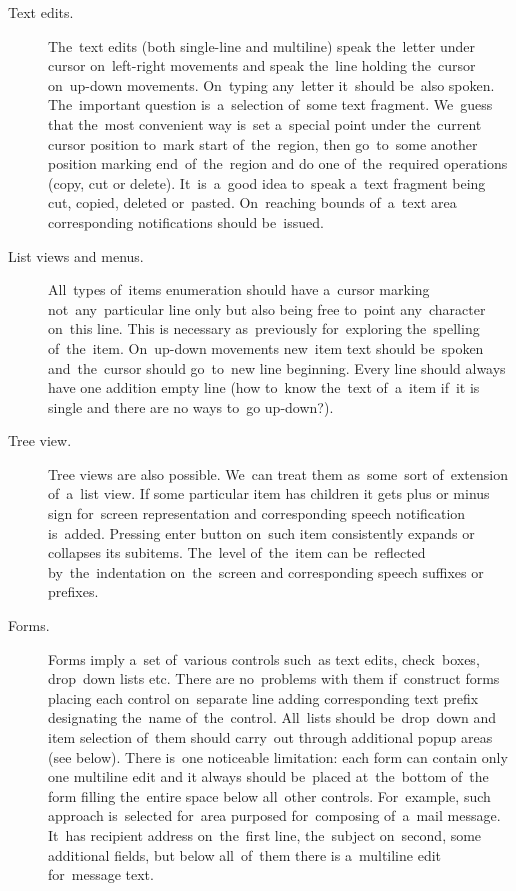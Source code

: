 \documentclass{acm_proc_article-sp}
\begin{document}
\begin{description}

\item[Text edits.]
The~text edits (both single-line and multiline) speak the~letter under cursor on~left-right movements 
and speak the~line holding the~cursor on~up-down movements.
On~typing any~letter it~should be~also spoken.
The~important question is~a~selection of~some text fragment.
We~guess that the~most convenient way is~set a~special point under the~current cursor position to~mark start of~the~region,
then go~to~some another position marking end~of~the~region and do one of~the~required operations (copy, cut or delete).
It~is~a~good idea to~speak a~text fragment being cut, copied, deleted or~pasted.
On~reaching bounds of~a~text area corresponding notifications should be~issued.

\item[List views and menus.]  
All~types of~items enumeration should  have a~cursor 
marking not~any~particular line only but also being free to~point any~character on~this line.
This is necessary as~previously for~exploring the~spelling of~the~item.
On~up-down movements   new~item text should be~spoken and~the~cursor should go~to~new line beginning. 
Every line should always have one addition empty line (how to~know the~text of~a~item if~it is single and there are no ways to~go up-down?).

\item[Tree view.]
Tree views are also possible.
We~can treat them as~some~sort of~extension of~a~list view.
If some particular item has children it gets plus or minus sign for~screen representation 
and corresponding speech notification is~added.
Pressing enter button on~such item consistently expands or collapses its subitems.
The~level of~the~item can be~reflected by~the~indentation on~the~screen and corresponding speech suffixes or prefixes.

\item[Forms.]
Forms imply a~set of~various controls such~as text edits, check~boxes, drop~down lists etc.
There are no~problems with them if~construct forms placing each control on~separate line adding corresponding text prefix 
designating the~name of~the~control.
All~lists should be~drop~down and item selection of~them should carry~out through additional popup areas (see below).
There is~one noticeable limitation: each form can contain only one multiline edit 
and it always should be~placed at~the~bottom of~the form filling the~entire space below all~other controls.
For~example, such approach is~selected for~area purposed for~composing of~a~mail message.
It~has recipient address on~the~first line, 
the~subject on~second, some additional fields,
but below all~of~them there is a~multiline edit for~message text. 
\end{description}
\end{document}
